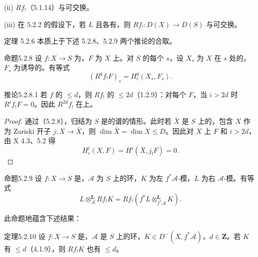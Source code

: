 (ii)  $Rf_!$（5.1.14）与可交换。

(iii) 在 5.2.2 的假设下，若 $L$ 且各有，则 $Rf_!:D(X)\to D(S)$ 与可交换。

定理 5.2.6 本质上于下述 5.2.8、5.2.9 两个推论的合取。
\begin{SGAresult}{命题}{5.2.8}
设 $f:X\to S$ 为，$F$ 为 $X$ 上。对 $S$ 的每个 $s$，设 $X_s$ 为 $X$ 在 $s$ 处的，$F_s$ 为诱导的。有等式
\[(R^qf_!F)_s=H_c^q(X_s,F_s).\]
\end{SGAresult}
\begin{SGAresult}{推论}{5.2.8.1}
若 $f$ 的 $\le d$，则 $Rf_!$ 的 $\le2d$（1.2.9）：对每个 $F$，当 $i>2d$ 时 $R^if_!F=0$。因此 $R^{2d}f_!$ 在上。
\end{SGAresult}
\begin{proof}
通过（5.2.8），归结为 $S$ 是的谱的情形。此时若 $\bar X$ 是 $S$ 上的，包含 $X$ 作为 Zariski 开子 $j:X\to\bar X$，则 $\dim\bar X=\dim X\le D$。因此对 $X$ 上 $F$ 和 $i>2d$，由 X 4.3、5.2 得
\[H_c^i(X,F)=H^i(\bar X,j_!F)=0.\]
\end{proof}
\begin{SGAresult}{命题}{5.2.9}
设 $f:X\to S$ 是，$\mathscr A$ 为 $S$ 上的环，$K$ 为左 $f^*\mathscr A$-模，$L$ 为右 $\mathscr A$-模。有等式
\[L\otimes^{\mathbf L}_{\mathscr A}Rf_!K=Rf_!(f^*L\otimes^{\mathbf L}_{f^*\mathscr A}K).\]
\end{SGAresult}
此命题地蕴含下述结果：
\begin{SGAresult}{定理}{5.2.10}
设 $f:X\to S$ 是，$\mathscr A$ 是 $S$ 上的环，$K\in D^-(X,f^*\mathscr A)$，$d\in\mathbf Z$。若 $K$ 有 $\le d$（4.1.9），则 $Rf_!K$ 也有 $\le d$。
\end{SGAresult}

